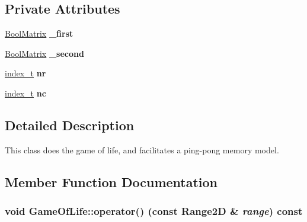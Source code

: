 \subsection*{Private Attributes}
\begin{CompactItemize}
\item 
\hypertarget{class_game_of_life_8bdab545960821d63692c05b875199db}{
\hyperlink{cowichan_8hpp_a64c8df2f1e9c8ea68a7bcc19aca683e}{BoolMatrix} \textbf{\_\-first}}
\label{class_game_of_life_8bdab545960821d63692c05b875199db}

\item 
\hypertarget{class_game_of_life_d772ef5614e6b178fb8d653589f1f1f9}{
\hyperlink{cowichan_8hpp_a64c8df2f1e9c8ea68a7bcc19aca683e}{BoolMatrix} \textbf{\_\-second}}
\label{class_game_of_life_d772ef5614e6b178fb8d653589f1f1f9}

\item 
\hypertarget{class_game_of_life_5a16e4e2b0d83c5e3f0e84cc3ff4db5f}{
\hyperlink{cowichan_8hpp_5b04577d5d21124855deaad298595371}{index\_\-t} \textbf{nr}}
\label{class_game_of_life_5a16e4e2b0d83c5e3f0e84cc3ff4db5f}

\item 
\hypertarget{class_game_of_life_eda1db7eabff4386e01714cf621b072d}{
\hyperlink{cowichan_8hpp_5b04577d5d21124855deaad298595371}{index\_\-t} \textbf{nc}}
\label{class_game_of_life_eda1db7eabff4386e01714cf621b072d}

\end{CompactItemize}


\subsection{Detailed Description}
This class does the game of life, and facilitates a ping-pong memory model. 

\subsection{Member Function Documentation}
\hypertarget{class_game_of_life_dfa4429cd90a9a8a7539ecb5a4617ae8}{
\subsubsection[{operator()}]{\setlength{\rightskip}{0pt plus 5cm}void GameOfLife::operator() (const {\bf Range2D} \& {\em range}) const}}
\label{class_game_of_life_dfa4429cd90a9a8a7539ecb5a4617ae8}


